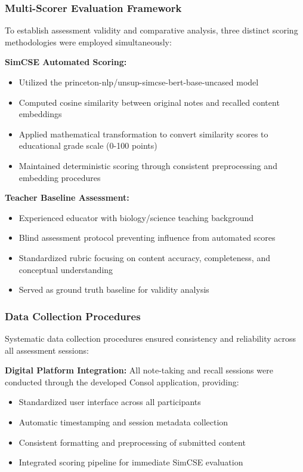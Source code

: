 \subsubsection{Multi-Scorer Evaluation Framework}

To establish assessment validity and comparative analysis, three distinct scoring methodologies were employed simultaneously:

\textbf{SimCSE Automated Scoring:}
\begin{itemize}
    \item Utilized the princeton-nlp/unsup-simcse-bert-base-uncased model
    \item Computed cosine similarity between original notes and recalled content embeddings
    \item Applied mathematical transformation to convert similarity scores to educational grade scale (0-100 points)
    \item Maintained deterministic scoring through consistent preprocessing and embedding procedures
\end{itemize}

\textbf{Teacher Baseline Assessment:}
\begin{itemize}
    \item Experienced educator with biology/science teaching background
    \item Blind assessment protocol preventing influence from automated scores
    \item Standardized rubric focusing on content accuracy, completeness, and conceptual understanding
    \item Served as ground truth baseline for validity analysis
\end{itemize}

\subsubsection{Data Collection Procedures}

Systematic data collection procedures ensured consistency and reliability across all assessment sessions:

\textbf{Digital Platform Integration:} All note-taking and recall sessions were conducted through the developed Consol application, providing:
\begin{itemize}
    \item Standardized user interface across all participants
    \item Automatic timestamping and session metadata collection
    \item Consistent formatting and preprocessing of submitted content
    \item Integrated scoring pipeline for immediate SimCSE evaluation
\end{itemize}

